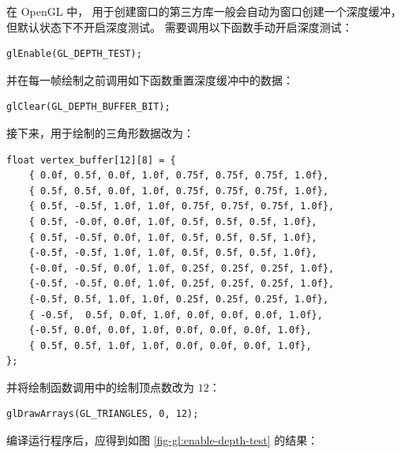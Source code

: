 \documentclass[fontset=windows]{ctexart}
\begin{document}
在 OpenGL 中，
用于创建窗口的第三方库一般会自动为窗口创建一个深度缓冲，
但默认状态下不开启深度测试。
需要调用以下函数手动开启深度测试：

\begin{lstlisting}
glEnable(GL_DEPTH_TEST);
\end{lstlisting}

并在每一帧绘制之前调用如下函数重置深度缓冲中的数据：

\begin{lstlisting}
glClear(GL_DEPTH_BUFFER_BIT);
\end{lstlisting}

接下来，用于绘制的三角形数据改为：

\begin{lstlisting}
float vertex_buffer[12][8] = {
    { 0.0f, 0.5f, 0.0f, 1.0f, 0.75f, 0.75f, 0.75f, 1.0f},
    { 0.5f, 0.5f, 0.0f, 1.0f, 0.75f, 0.75f, 0.75f, 1.0f},
    { 0.5f, -0.5f, 1.0f, 1.0f, 0.75f, 0.75f, 0.75f, 1.0f},
    { 0.5f, -0.0f, 0.0f, 1.0f, 0.5f, 0.5f, 0.5f, 1.0f},
    { 0.5f, -0.5f, 0.0f, 1.0f, 0.5f, 0.5f, 0.5f, 1.0f},
    {-0.5f, -0.5f, 1.0f, 1.0f, 0.5f, 0.5f, 0.5f, 1.0f},
    {-0.0f, -0.5f, 0.0f, 1.0f, 0.25f, 0.25f, 0.25f, 1.0f},
    {-0.5f, -0.5f, 0.0f, 1.0f, 0.25f, 0.25f, 0.25f, 1.0f},
    {-0.5f, 0.5f, 1.0f, 1.0f, 0.25f, 0.25f, 0.25f, 1.0f},
    { -0.5f,  0.5f, 0.0f, 1.0f, 0.0f, 0.0f, 0.0f, 1.0f},
    {-0.5f, 0.0f, 0.0f, 1.0f, 0.0f, 0.0f, 0.0f, 1.0f},
    { 0.5f, 0.5f, 1.0f, 1.0f, 0.0f, 0.0f, 0.0f, 1.0f},
};
\end{lstlisting}

并将绘制函数调用中的绘制顶点数改为 $12$：

\begin{lstlisting}
glDrawArrays(GL_TRIANGLES, 0, 12);
\end{lstlisting}

编译运行程序后，应得到如图 \ref{fig-gl:enable-depth-test} 的结果：
\end{document}
